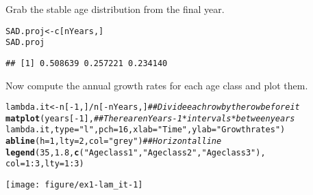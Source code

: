 \documentclass[12pt]{article}\usepackage[]{graphicx}\usepackage[]{xcolor}
\makeatletter
\newcommand{\hlnum}[1]{\textcolor[rgb]{0.686,0.059,0.569}{#1}}%
\newcommand{\hlsng}[1]{\textcolor[rgb]{0.192,0.494,0.8}{#1}}%
\newcommand{\hlcom}[1]{\textcolor[rgb]{0.678,0.584,0.686}{\textit{#1}}}%
\newcommand{\hlopt}[1]{\textcolor[rgb]{0,0,0}{#1}}%
\newcommand{\hldef}[1]{\textcolor[rgb]{0.345,0.345,0.345}{#1}}%
\newcommand{\hlkwb}[1]{\textcolor[rgb]{0.69,0.353,0.396}{#1}}%
\newcommand{\hlkwc}[1]{\textcolor[rgb]{0.333,0.667,0.333}{#1}}%
\newcommand{\hlkwd}[1]{\textcolor[rgb]{0.737,0.353,0.396}{\textbf{#1}}}%
\newenvironment{kframe}{%
 \def\at@end@of@kframe{}%
 \ifinner\ifhmode%
  \def\at@end@of@kframe{\end{minipage}}%
  \begin{minipage}{\columnwidth}%
 \fi\fi%
 \def\FrameCommand##1{\hskip\@totalleftmargin \hskip-\fboxsep
 \colorbox{shadecolor}{##1}\hskip-\fboxsep
     \hskip-\linewidth \hskip-\@totalleftmargin \hskip\columnwidth}%
 \MakeFramed {\advance\hsize-\width
   \@totalleftmargin\z@ \linewidth\hsize
   \@setminipage}}%
 {\par\unskip\endMakeFramed%
 \at@end@of@kframe}
\newenvironment{knitrout}{}{} %
\makeatother
\begin{document}
Grab the stable age distribution from the final year.
\begin{knitrout}
\color{fgcolor}\begin{kframe}
\begin{alltt}
\hldef{SAD.proj} \hlkwb{<-} \hldef{c[nYears,]}
\hldef{SAD.proj}
\end{alltt}
\begin{verbatim}
## [1] 0.508639 0.257221 0.234140
\end{verbatim}
\end{kframe}
\end{knitrout}


\clearpage

Now compute the annual growth rates for each age class and plot them.
\begin{knitrout}
\color{fgcolor}\begin{kframe}
\begin{alltt}
\hldef{lambda.it} \hlkwb{<-} \hldef{n[}\hlopt{-}\hlnum{1}\hldef{,]}\hlopt{/}\hldef{n[}\hlopt{-}\hldef{nYears,]} \hlcom{## Divide each row by the row before it}
\hlkwd{matplot}\hldef{(years[}\hlopt{-}\hlnum{1}\hldef{],} \hlcom{## There are nYears-1 *intervals* between years}
        \hldef{lambda.it,} \hlkwc{type}\hldef{=}\hlsng{"l"}\hldef{,} \hlkwc{pch}\hldef{=}\hlnum{16}\hldef{,} \hlkwc{xlab}\hldef{=}\hlsng{"Time"}\hldef{,} \hlkwc{ylab}\hldef{=}\hlsng{"Growth rates"}\hldef{)}
\hlkwd{abline}\hldef{(}\hlkwc{h}\hldef{=}\hlnum{1}\hldef{,} \hlkwc{lty}\hldef{=}\hlnum{2}\hldef{,} \hlkwc{col}\hldef{=}\hlsng{"grey"}\hldef{)} \hlcom{## Horizontal line}
\hlkwd{legend}\hldef{(}\hlnum{35}\hldef{,} \hlnum{1.8}\hldef{,} \hlkwd{c}\hldef{(}\hlsng{"Age class 1"}\hldef{,} \hlsng{"Age class 2"}\hldef{,} \hlsng{"Age class 3"}\hldef{),}
       \hlkwc{col}\hldef{=}\hlnum{1}\hlopt{:}\hlnum{3}\hldef{,} \hlkwc{lty}\hldef{=}\hlnum{1}\hlopt{:}\hlnum{3}\hldef{)}
\end{alltt}
\end{kframe}

{\centering \texttt{[image: figure/ex1-lam\_it-1]} 

}


\end{knitrout}
\end{document}

